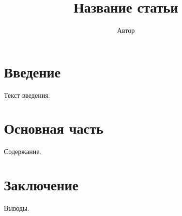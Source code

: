 \documentclass{article}
\begin{document}
\title{Название статьи}
\author{Автор}
\maketitle
\section{Введение}
Текст введения.
\section{Основная часть}
Содержание.
\section{Заключение}
Выводы.
\end{document}
